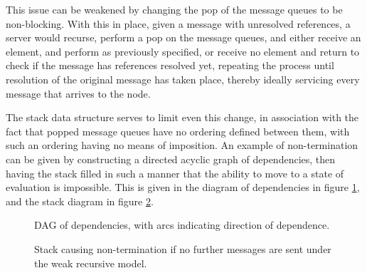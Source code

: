 This issue can be weakened by changing the pop of the message queues to be
non-blocking.
With this in place, given a message with unresolved references, a server would
recurse, perform a pop on the message queues, and either receive an element,
and perform as previously specified, or receive no element and return to check
if the message has references resolved yet, repeating the process until
resolution of the original message has taken place, thereby ideally servicing
every message that arrives to the node.

The stack data structure serves to limit even this change, in association with
the fact that popped message queues have no ordering defined between them, with
such an ordering having no means of imposition.
An example of non-termination can be given by constructing a directed acyclic
graph of dependencies, then having the stack filled in such a manner that the
ability to move to a state of evaluation is impossible.
This is given in the diagram of dependencies in figure \cref{fig:deps}, and the
stack diagram in figure \cref{fig:deps-block-stack}.

\begin{figure}
	\centering
	\caption{\label{fig:deps}DAG of dependencies, with arcs indicating
	direction of dependence.}
\end{figure}

\begin{figure}
	\centering
	\caption{\label{fig:deps-block-stack}Stack causing non-termination if
	no further messages are sent under the weak recursive model.} 
\end{figure}


